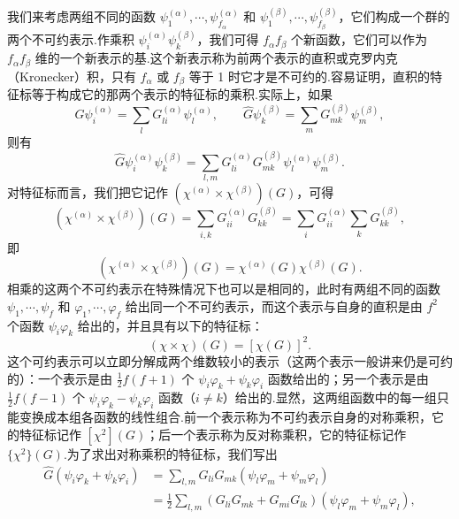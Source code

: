 我们来考虑两组不同的函数 $\psi_1^{(\alpha)},\cdots,\psi_{f_\alpha}^{(\alpha)}$ 和 $\psi_1^{(\beta)},\cdots,\psi_{f_\beta}^{(\beta)}$，它们构成一个群的两个不可约表示.作乘积 $\psi_i^{(\alpha)}\psi_k^{(\beta)}$，我们可得 $f_\alpha f_\beta$ 个新函数，它们可以作为 $f_\alpha f_\beta$ 维的一个新表示的基.这个新表示称为前两个表示的直积或克罗内克（Kronecker）积，只有 $f_\alpha$ 或 $f_\beta$ 等于 1 时它才是不可约的.容易证明，直积的特征标等于构成它的那两个表示的特征标的乘积.实际上，如果
\begin{equation*}
  \hat{G}\psi_i^{(\alpha)}=\sum_l G_{li}^{(\alpha)}\psi_l^{(\alpha)},\qquad
  \hat{G}\psi_k^{(\beta)}=\sum_m G_{mk}^{(\beta)}\psi_m^{(\beta)},
\end{equation*}
则有
\begin{equation*}
  \hat{G}\psi_i^{(\alpha)}\psi_k^{(\beta)}
  =\sum_{l,m}G_{li}^{(\alpha)}G_{mk}^{(\beta)}\psi_l^{(\alpha)}\psi_m^{(\beta)}.
\end{equation*}
对特征标而言，我们把它记作 $\left(\chi^{(\alpha)}\times\chi^{(\beta)}\right)(G)$，可得
\begin{equation*}
  \left(\chi^{(\alpha)}\times\chi^{(\beta)}\right)(G)
  =\sum_{i,k}G_{ii}^{(\alpha)}G_{kk}^{(\beta)}
  =\sum_i G_{ii}^{(\alpha)}\sum_k G_{kk}^{(\beta)},
\end{equation*}
即
\begin{equation}
  \left(\chi^{(\alpha)}\times\chi^{(\beta)}\right)(G)
  =\chi^{(\alpha)}(G)\chi^{(\beta)}(G).
\end{equation}
相乘的这两个不可约表示在特殊情况下也可以是相同的，此时有两组不同的函数 $\psi_1,\cdots,\psi_f$ 和 $\varphi_1,\cdots,\varphi_f$ 给出同一个不可约表示，而这个表示与自身的直积是由 $f^2$ 个函数 $\psi_i\varphi_k$ 给出的，并且具有以下的特征标：
\begin{equation*}
  \left(\chi\times\chi\right)(G)=\left[\chi(G)\right]^2.
\end{equation*}
这个可约表示可以立即分解成两个维数较小的表示（这两个表示一般讲来仍是可约的）：一个表示是由 $\frac{1}{2}f(f+1)$ 个 $\psi_i\varphi_k+\psi_k\varphi_i$ 函数给出的；另一个表示是由 $\frac{1}{2}f(f-1)$ 个 $\psi_i\varphi_k-\psi_k\varphi_i$ 函数（$i\neq k$）给出的.显然，这两组函数中的每一组只能变换成本组各函数的线性组合.前一个表示称为不可约表示自身的对称乘积，它的特征标记作 $[\chi^2](G)$；后一个表示称为反对称乘积，它的特征标记作 $\{\chi^2\}(G)$.为了求出对称乘积的特征标，我们写出
\begin{equation*}
\begin{aligned}
  \hat{G}\left(\psi_i\varphi_k+\psi_k\varphi_i\right)
  &=\sum_{l,m}G_{li}G_{mk}\left(\psi_l\varphi_m+\psi_m\varphi_l\right)\\
  &=\frac{1}{2}\sum_{l,m}\left(G_{li}G_{mk}+G_{mi}G_{lk}\right)
  \left(\psi_l\varphi_m+\psi_m\varphi_l\right),
\end{aligned}
\end{equation*}
